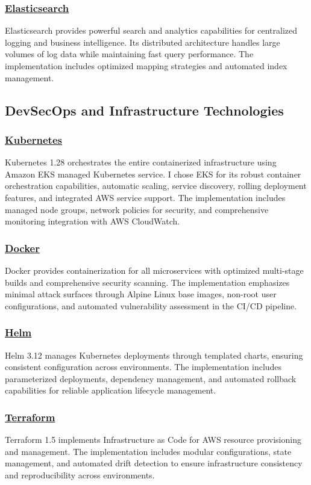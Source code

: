 \subsubsection*{\underline{Elasticsearch}}
Elasticsearch provides powerful search and analytics capabilities for centralized logging and business intelligence. Its distributed architecture handles large volumes of log data while maintaining fast query performance. The implementation includes optimized mapping strategies and automated index management.

\subsection{DevSecOps and Infrastructure Technologies}

\subsubsection*{\underline{Kubernetes}}
Kubernetes 1.28 orchestrates the entire containerized infrastructure using Amazon EKS managed Kubernetes service. I chose EKS for its robust container orchestration capabilities, automatic scaling, service discovery, rolling deployment features, and integrated AWS service support. The implementation includes managed node groups, network policies for security, and comprehensive monitoring integration with AWS CloudWatch.

\subsubsection*{\underline{Docker}}
Docker provides containerization for all microservices with optimized multi-stage builds and comprehensive security scanning. The implementation emphasizes minimal attack surfaces through Alpine Linux base images, non-root user configurations, and automated vulnerability assessment in the CI/CD pipeline.

\subsubsection*{\underline{Helm}}
Helm 3.12 manages Kubernetes deployments through templated charts, ensuring consistent configuration across environments. The implementation includes parameterized deployments, dependency management, and automated rollback capabilities for reliable application lifecycle management.

\subsubsection*{\underline{Terraform}}
Terraform 1.5 implements Infrastructure as Code for AWS resource provisioning and management. The implementation includes modular configurations, state management, and automated drift detection to ensure infrastructure consistency and reproducibility across environments.

